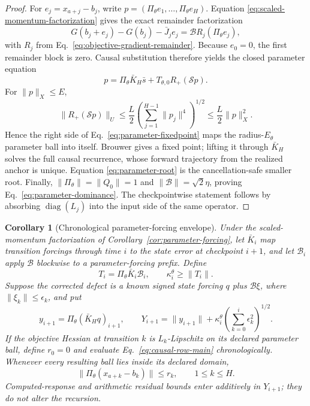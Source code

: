 \documentclass{article}
\newtheorem{corollary}{Corollary}
\begin{document}
\begin{proof}
For $e_j=x_{a+j}-b_j$, write
$p=(\Pi_\theta e_1,\ldots,\Pi_\theta e_H)$.  Equation
\eqref{eq:scaled-momentum-factorization} gives the exact remainder
factorization
\begin{equation}
 G(b_j+e_j)-G(b_j)-\bar J_je_j
 =\mathcal B R_j(\Pi_\theta e_j),
\end{equation}
with $R_j$ from Eq.~\eqref{eq:objective-gradient-remainder}.  Because
$e_0=0$, the first remainder block is zero.  Causal substitution therefore
yields the closed parameter equation
\begin{equation}
 p=\Pi_\theta\bar K_H\bar s+
 T_{\theta,0}R_+(\mathcal Sp).
 \label{eq:parameter-fixedpoint}
\end{equation}
For $\|p\|_X\le E$,
\begin{equation}
 \|R_+(\mathcal Sp)\|_U
 \le \frac L2
 \left(\sum_{j=1}^{H-1}\|p_j\|^4\right)^{1/2}
 \le \frac L2\|p\|_X^2.
\end{equation}
Hence the right side of Eq.~\eqref{eq:parameter-fixedpoint} maps the
radius-$E_\theta$ parameter ball into itself.  Brouwer gives a fixed point;
lifting it through $\bar K_H$ solves the full causal recurrence, whose forward
trajectory from the realized anchor is unique.  Equation
\eqref{eq:parameter-root} is the cancellation-safe smaller root.  Finally,
$\|\Pi_\theta\|=\|Q_0\|=1$ and
$\|\mathcal B\|=\sqrt2\eta$, proving
Eq.~\eqref{eq:parameter-dominance}.  The checkpointwise statement follows by
absorbing $\operatorname{diag}(L_j)$ into the input side of the same operator.
\end{proof}

\begin{corollary}[Chronological parameter-forcing envelope]
\label{cor:causal-parameter-row}
Under the scaled-momentum factorization of
Corollary~\ref{cor:parameter-forcing}, let $\bar K_i$ map transition forcings
through time $i$ to the state error at checkpoint $i+1$, and let
$\mathcal B_i$ apply $\mathcal B$ blockwise to a parameter-forcing prefix.
Define
\begin{equation}
 T_i=\Pi_\theta\bar K_i\mathcal B_i,\qquad
 \kappa_i^\theta\ge\|T_i\|.
 \label{eq:causal-parameter-row}
\end{equation}
Suppose the corrected defect is a known signed state forcing $q$ plus
$\mathcal B\xi$, where $\|\xi_k\|\le\epsilon_k$, and put
\begin{equation}
 y_{i+1}=\Pi_\theta(\bar K_Hq)_{i+1},\qquad
 Y_{i+1}=\|y_{i+1}\|+\kappa_i^\theta
 \left(\sum_{k=0}^{i}\epsilon_k^2\right)^{1/2}.
 \label{eq:causal-row-affine}
\end{equation}
If the objective Hessian at transition $k$ is $L_k$-Lipschitz on its declared
parameter ball, define $r_0=0$ and evaluate
Eq.~\eqref{eq:causal-row-main} chronologically.  Whenever every resulting ball
lies inside its declared domain,
\begin{equation}
 \|\Pi_\theta(x_{a+k}-b_k)\|\le r_k,
 \qquad 1\le k\le H.
 \label{eq:causal-row-tube}
\end{equation}
Computed-response and arithmetic residual bounds enter additively in
$Y_{i+1}$; they do not alter the recursion.
\end{corollary}
\end{document}
